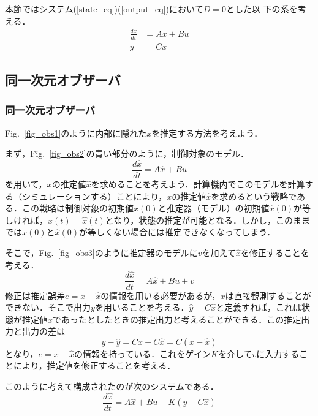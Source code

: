 本節ではシステム(\ref{state_eq})(\ref{output_eq})において$D=0$とした以
下の系を考える．
\begin{align}
 \frac{dx}{dt} &= A x + B u \label{st_proper_state_eq_2} \\
 y             &= C x \label{st_proper_output_eq_2}
\end{align}
\subsection{同一次元オブザーバ}


\subsubsection{同一次元オブザーバ}

Fig.~\ref{fig_obs1}のように内部に隠れた$x$を推定する方法を考えよう．

まず，Fig.~\ref{fig_obs2}の青い部分のように，制御対象のモデル．
\begin{equation}
 \frac{d \hat{x}}{dt} = A \hat{x} + B u 
\end{equation}
を用いて，$x$の推定値$\hat{x}$を求めることを考えよう．計算機内でこのモデルを計算する（シミュレーションする）ことにより，$x$の推定値$\hat{x}$を求めるという戦略である．この戦略は制御対象の初期値$x(0)$と推定器（モデル）の初期値$\hat{x}(0)$が等しければ，$x(t)=\hat{x}(t)$となり，状態の推定が可能となる．しかし，このままでは$x(0)$と$\hat{x}(0)$が等しくない場合には推定できなくなってしまう．

そこで，Fig.~\ref{fig_obs3}のように推定器のモデルに$v$を加えて$\hat{x}$を修正することを考える．
\begin{equation}
 \frac{d \hat{x}}{dt} = A \hat{x} + B u + v
\end{equation}
修正は推定誤差$e=x-\hat{x}$の情報を用いる必要があるが，$x$は直接観測することができない．そこで出力$y$を用いることを考える．$\hat{y}=C\hat{x}$と定義すれば，これは状態が推定値$\hat{x}$であったとしたときの推定出力と考えることができる．この推定出力と出力の差は
\begin{equation}
  y-\hat{y}=Cx-C\hat{x}=C(x-\hat{x})
\end{equation}
となり，$e=x-\hat{x}$の情報を持っている．これをゲイン$K$を介して$v$に入力することにより，推定値を修正することを考える．


このように考えて構成されたのが次のシステムである．
\begin{equation}
 \frac{d \hat{x}}{dt} = A \hat{x} + B u - K (y - C \hat{x})
  \label{obs_org}
\end{equation}

